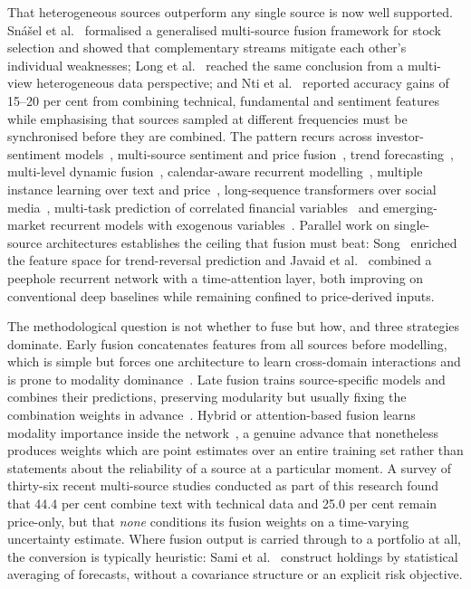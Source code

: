 That heterogeneous sources outperform any single source is now well supported. Sn\'a\v{s}el et
al.~\cite{snasel2024} formalised a generalised multi-source fusion framework for stock selection
and showed that complementary streams mitigate each other's individual weaknesses; Long et
al.~\cite{long2024} reached the same conclusion from a multi-view heterogeneous data
perspective; and Nti et al.~\cite{nti2021} reported accuracy gains of 15--20 per cent from
combining technical, fundamental and sentiment features while emphasising that sources sampled
at different frequencies must be synchronised before they are combined. The pattern recurs
across investor-sentiment models~\cite{mu2023investor}, multi-source sentiment and price
fusion~\cite{fu2024}, trend forecasting~\cite{shaban2024}, multi-level dynamic
fusion~\cite{dong2024}, calendar-aware recurrent modelling~\cite{chen2024lasso}, multiple
instance learning over text and price~\cite{zhang2018mil}, long-sequence transformers over
social media~\cite{zhu2025informer}, multi-task prediction of correlated financial
variables~\cite{hong2025mtl} and emerging-market recurrent models with exogenous
variables~\cite{alsheebah2024}. Parallel work on single-source architectures establishes the
ceiling that fusion must beat: Song~\cite{song2024} enriched the feature space for
trend-reversal prediction and Javaid et al.~\cite{javaid2024} combined a peephole recurrent
network with a time-attention layer, both improving on conventional deep baselines while
remaining confined to price-derived inputs.

The methodological question is not whether to fuse but how, and three strategies dominate.
Early fusion concatenates features from all sources before modelling, which is simple but
forces one architecture to learn cross-domain interactions and is prone to modality
dominance~\cite{moodi2024,li2023datafusion}. Late fusion trains source-specific models and
combines their predictions, preserving modularity but usually fixing the combination weights in
advance~\cite{farimani2024,vargas2022}. Hybrid or attention-based fusion learns modality
importance inside the network~\cite{choi2023,haryono2023,liu2019attention,zong2025,tai2022}, a
genuine advance that nonetheless produces weights which are point estimates over an entire
training set rather than statements about the reliability of a source at a particular moment. A
survey of thirty-six recent multi-source studies conducted as part of this research found that
44.4 per cent combine text with technical data and 25.0 per cent remain price-only, but that
\emph{none} conditions its fusion weights on a time-varying uncertainty estimate. Where fusion
output is carried through to a portfolio at all, the conversion is typically heuristic: Sami et
al.~\cite{sami2025} construct holdings by statistical averaging of forecasts, without a
covariance structure or an explicit risk objective.

